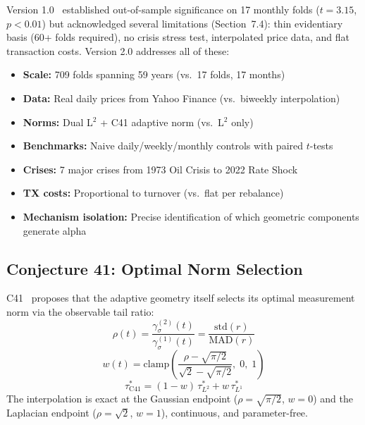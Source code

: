 \documentclass[11pt,a4paper]{article}
\begin{document}
Version 1.0~\cite{bronsard2026fin_v1} established out-of-sample significance on 17 monthly folds ($t = 3.15$, $p < 0.01$) but acknowledged several limitations (Section~7.4): thin evidentiary basis (60+ folds required), no crisis stress test, interpolated price data, and flat transaction costs. Version 2.0 addresses all of these:

\begin{itemize}[nosep]
  \item \textbf{Scale:} 709 folds spanning 59 years (vs.\ 17 folds, 17 months)
  \item \textbf{Data:} Real daily prices from Yahoo Finance (vs.\ biweekly interpolation)
  \item \textbf{Norms:} Dual L$^2$ + C41 adaptive norm (vs.\ L$^2$ only)
  \item \textbf{Benchmarks:} Naive daily/weekly/monthly controls with paired $t$-tests
  \item \textbf{Crises:} 7 major crises from 1973 Oil Crisis to 2022 Rate Shock
  \item \textbf{TX costs:} Proportional to turnover (vs.\ flat per rebalance)
  \item \textbf{Mechanism isolation:} Precise identification of which geometric components generate alpha
\end{itemize}

\subsection{Conjecture 41: Optimal Norm Selection}

C41~\cite{bronsard2026c41} proposes that the adaptive geometry itself selects its optimal measurement norm via the observable tail ratio:
\begin{equation}\label{eq:rho}
  \rho(t) = \frac{\gamma^{(2)}_\sigma(t)}{\gamma^{(1)}_\sigma(t)} = \frac{\mathrm{std}(r)}{\mathrm{MAD}(r)}
\end{equation}
\begin{equation}\label{eq:w}
  w(t) = \mathrm{clamp}\!\left(\frac{\rho - \sqrt{\pi/2}}{\sqrt{2} - \sqrt{\pi/2}},\; 0,\; 1\right)
\end{equation}
\begin{equation}\label{eq:c41}
  \tau^*_{\text{C41}} = (1 - w)\,\tau^*_{L^2} + w\,\tau^*_{L^1}
\end{equation}
The interpolation is exact at the Gaussian endpoint ($\rho = \sqrt{\pi/2}$, $w = 0$) and the Laplacian endpoint ($\rho = \sqrt{2}$, $w = 1$), continuous, and parameter-free.
\end{document}

